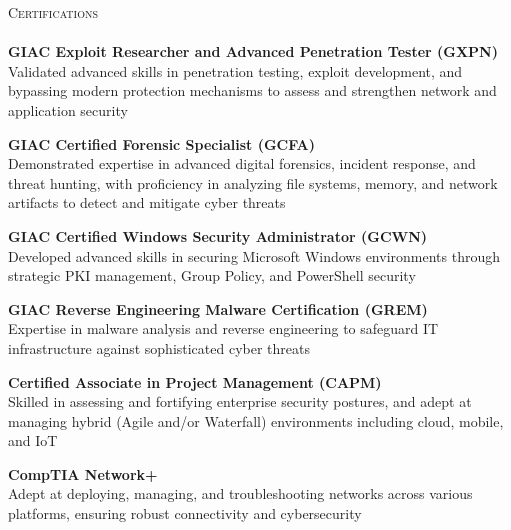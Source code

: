 \documentclass[a4paper]{article}
\newcommand{\lineunder} {
        \vspace*{-8pt} \\
        \hspace*{-18pt} \hrulefill \\
    }
\newcommand{\header} [1] {
        {\hspace*{-18pt}\vspace*{6pt} \textsc{#1}}
        \vspace*{-6pt} \lineunder
    }
\begin{document}
    \header{Certifications}
    
            {\textbf{GIAC Exploit Researcher and Advanced Penetration Tester (GXPN)}}\\
            Validated advanced skills in penetration testing, exploit development, and bypassing modern protection mechanisms to assess and strengthen network and application security\\
            \vspace*{2mm}
            
            {\textbf{GIAC Certified Forensic Specialist (GCFA)}}\\
            Demonstrated expertise in advanced digital forensics, incident response, and threat hunting, with proficiency in analyzing file systems, memory, and network artifacts to detect and mitigate cyber threats\\
            \vspace*{2mm}
            
            {\textbf{GIAC Certified Windows Security Administrator (GCWN)}}\\
            Developed advanced skills in securing Microsoft Windows environments through strategic PKI management, Group Policy, and PowerShell security\\
            \vspace*{2mm}
            
            {\textbf{GIAC Reverse Engineering Malware Certification (GREM)}}\\
            Expertise in malware analysis and reverse engineering to safeguard IT infrastructure against sophisticated cyber threats\\
            \vspace*{2mm}
            
            {\textbf{Certified Associate in Project Management (CAPM)}}\\
            Skilled in assessing and fortifying enterprise security postures, and adept at managing hybrid (Agile and/or Waterfall) environments including cloud, mobile, and IoT\\
            \vspace*{2mm}
            
            {\textbf{CompTIA Network+}}\\
            Adept at deploying, managing, and troubleshooting networks across various platforms, ensuring robust connectivity and cybersecurity\\
            \vspace*{2mm}
            
\end{document}
